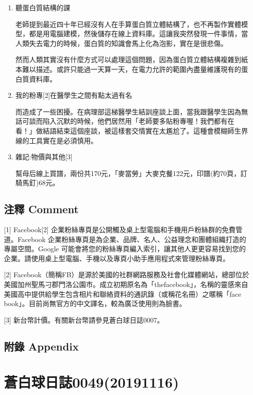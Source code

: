 \documentclass[a5paper, 12pt
]{book}
\begin{document}
\begin{enumerate}
\def\labelenumi{\arabic{enumi}.}
\item
  聽蛋白質結構的課

  老師提到最近四十年已經沒有人在手算蛋白質立體結構了，也不再製作實體模型，都是用電腦建模，然後儲存在線上資料庫。這讓我突然發現一件事情，當人類失去電力的時候，蛋白質的知識會馬上化為泡影，實在是很悲傷。

  然而人類其實沒有什麼方式可以處理這個問題，因為蛋白質立體結構複雜到紙本難以描述。或許只能過一天算一天，在電力允許的範圍內盡量維護現有的蛋白質資料庫。
\item
  我的粉專{[}2{]}在醫學生之間有點太過有名

  而造成了一些困擾。在病理部這梯醫學生結訓座談上面，當我跟醫學生因為無話可談而陷入沉默的時候，他們居然用「老師要多貼粉專喔！我們都有在看！」做結語結束這個座談，被這樣套交情實在太尷尬了。這種會模糊師生界線的工具實在是必須慎用。
\item
  雜記:物價與其他{[}3{]}

  幫母后線上買譜，兩份共170元，「麥當勞」大麥克餐122元，印譜(約70頁，訂騎馬釘)68元。
\end{enumerate}

\hypertarget{ux6ce8ux91cb-comment-41}{%
\subsection{注釋 Comment}\label{ux6ce8ux91cb-comment-41}}

{[}1{]} Facebook{[}2{]}
企業粉絲專頁是公開觸及桌上型電腦和手機用戶粉絲群的免費管道。Facebook
企業粉絲專頁是為企業、品牌、名人、公益理念和團體組織打造的專屬空間。Google
可能會將您的粉絲專頁編入索引，讓其他人更更容易找到您的企業。請使用桌上型電腦、手機以及專頁小助手應用程式來管理粉絲專頁。

{[}2{]}
Facebook（簡稱FB）是源於美國的社群網路服務及社會化媒體網站，總部位於美國加州聖馬刁郡門洛公園市。成立初期原名為「thefacebook」，名稱的靈感來自美國高中提供給學生包含相片和聯絡資料的通訊錄（或稱花名冊）之暱稱「face
book」。目前尚無官方的中文譯名，較為廣泛使用則為臉書。

{[}3{]} 新台幣計價。有關新台幣請參見蒼白球日誌0007。

\hypertarget{ux9644ux9304-appendix-40}{%
\subsection{附錄 Appendix}\label{ux9644ux9304-appendix-40}}

\hypertarget{ux84bcux767dux7403ux65e5ux8a8c004920191116}{%
\section{蒼白球日誌0049(20191116)}\label{ux84bcux767dux7403ux65e5ux8a8c004920191116}}
\end{document}
